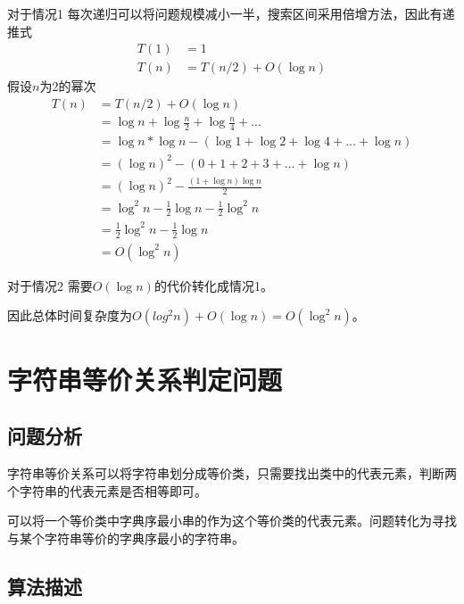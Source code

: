 对于情况1
每次递归可以将问题规模减小一半，搜索区间采用倍增方法，因此有递推式
\begin{equation}
    \begin{aligned}
        T(1) &= 1\\
        T(n) & =T(n/2) + O(\log n)
    \end{aligned}
    \nonumber
\end{equation}
假设$n$为2的幂次
\begin{equation}
    \begin{aligned}
        T(n) &= T(n/2) + O(\log n)\\
            &= \log n + \log \frac{n}{2} + \log \frac{n}{4} + ...\\
            &= \log n * \log n - (\log 1 + \log 2 + \log 4 + ... + \log n)\\
            &= (\log n) ^ 2 - (0+1+2+3+...+\log n)\\
            &= (\log n)^2 - \frac{(1+\log n)\log n}{2}\\
            &= \log^2 n - \frac{1}{2}\log n - \frac{1}{2} \log^2 n\\
            &= \frac{1}{2} \log^2 n - \frac{1}{2} \log n\\
            &= O(\log^2 n)
    \end{aligned}
    \nonumber
\end{equation}

对于情况2
需要$O(\log n)$的代价转化成情况1。

因此总体时间复杂度为$O(log^2 n) + O(\log n) = O(\log ^2 n)$。

\section{字符串等价关系判定问题}

\subsection*{问题分析}

字符串等价关系可以将字符串划分成等价类，只需要找出类中的代表元素，判断两个字符串的代表元素是否相等即可。

可以将一个等价类中字典序最小串的作为这个等价类的代表元素。问题转化为寻找与某个字符串等价的字典序最小的字符串。

\subsection*{算法描述}

